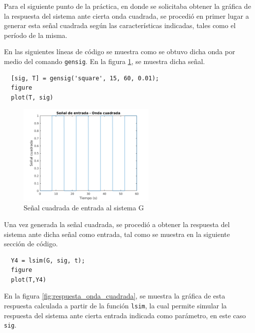 \documentclass[12pt,letterpaper]{article}
\begin{document}
Para el siguiente punto de la práctica, en donde se solicitaba obtener la gráfica de la respuesta
del sistema ante cierta onda cuadrada, se procedió en primer lugar a generar esta señal cuadrada según
las características indicadas, tales como el período de la misma.

En las siguientes líneas de código se muestra como se obtuvo dicha onda por medio del comando
\texttt{gensig}. En la figura \ref{fig:onda_cuadrada}, se muestra dicha señal.

\begin{lstlisting}[style=Matlab-editor, basicstyle=\mlttfamily]
  % Onda cuadrada
  [sig, T] = gensig('square', 15, 60, 0.01);
  figure
  plot(T, sig)
\end{lstlisting}

\begin{figure}[ht!]
	\centering
	\includegraphics[width=0.6\textwidth]{pictures/Ejercicio5/onda_cuadrada}
	\caption{Señal cuadrada de entrada al sistema G}
	\label{fig:onda_cuadrada}
\end{figure} 


Una vez generada la señal cuadrada, se procedió a obtener la respuesta del sistema ante dicha señal
como entrada, tal como se muestra en la siguiente sección de código.

\begin{lstlisting}[style=Matlab-editor, basicstyle=\mlttfamily]
  % Respuesta a la onda cuadrada
  Y4 = lsim(G, sig, t);
  figure
  plot(T,Y4)
\end{lstlisting}

En la figura \ref{fig:respuesta_onda_cuadrada}, se muestra la gráfica de esta respuesta calculada a
partir de la función \texttt{lsim}, la cual permite simular la respuesta del sistema ante cierta
entrada indicada como parámetro, en este caso \texttt{sig}. 
\end{document}
